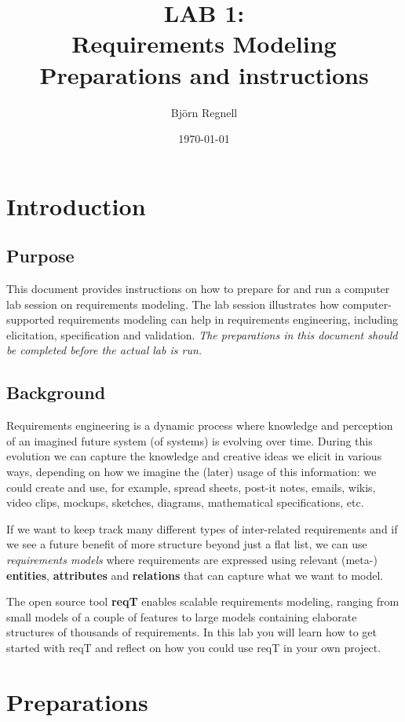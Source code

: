 \documentclass[11pt]{article}
\title{{\bf LAB 1:\\Requirements Modeling}\\ Preparations and instructions}
\author{Björn Regnell}
\date{\today}
\begin{document}
\maketitle

\section{Introduction}

\subsection{Purpose} This document provides instructions on how to prepare for and run a computer lab session on requirements modeling. The lab session illustrates how computer-supported requirements modeling can help in requirements engineering, including elicitation, specification and validation. {\it The preparations in this document should be completed before the actual lab is run.}

\subsection{Background} Requirements engineering is a dynamic process where knowledge and perception of an imagined future system (of systems) is evolving over time. During this evolution we can capture the knowledge and creative ideas we elicit in various ways, depending on how we imagine the (later) usage of this information: we could create and use, for example, spread sheets, post-it notes, emails, wikis, video clips, mockups, sketches, diagrams, mathematical specifications, etc. 

If we want to keep track many different types of inter-related requirements and if we see a future benefit of more structure beyond just a flat list, we can use {\it requirements models} where requirements are expressed using relevant (meta-) {\bf entities}, {\bf attributes} and {\bf relations} that can capture what we want to model.   

The open source tool {\bf reqT} enables scalable requirements modeling, ranging from small models of a couple of features to large models containing elaborate structures of thousands of requirements. In this lab you will learn how to get started with reqT and reflect on how you could use reqT in your own project.

\clearpage\newpage
\section{Preparations}
\end{document}
